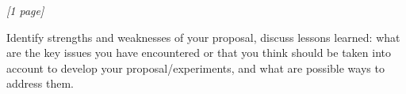 \textit{[1 page]}

\noindent
Identify strengths and weaknesses of your proposal, discuss lessons learned: what are the key issues you have encountered or that you think should be taken into account to develop your proposal/experiments, and what are possible ways to address them. 